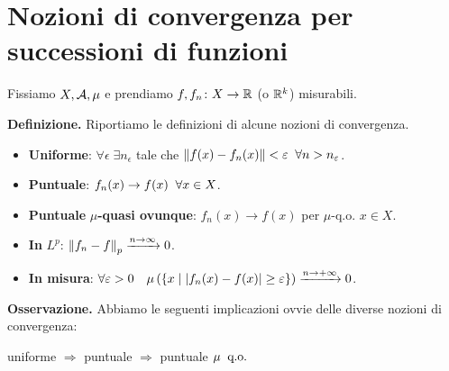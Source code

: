 %
%

\section{Nozioni di convergenza per successioni di funzioni}
Fissiamo $X,\mathcal{A},\mu$ e prendiamo $f, f_n \colon X \to \mathbb R$ (o $\mathbb R^k$) misurabili.

\textbf{Definizione.}
Riportiamo le definizioni di alcune nozioni di convergenza.

\begin{itemize}

\item \textbf{Uniforme}: $\forall \epsilon \; \exists n_{\epsilon}$ tale che $\left\lVert f(x) - f_n(x) \right\rVert < \varepsilon \;\; \forall n > n_\varepsilon$.

\item \textbf{Puntuale}: $f_n(x) \to f(x) \;\; \forall x \in X$.

\item \textbf{Puntuale} $\mu$\textbf{-quasi ovunque}: $f_n(x) \to f(x)$ per $\mu$-q.o. $x \in X$.

\item \textbf{In} $L^p$: $\left\lVert f_n - f \right\rVert_p \xrightarrow{n \to \infty} 0$.

\item \textbf{In misura}: $\displaystyle \forall \varepsilon > 0 \quad \mu \left( \left\{ x \;\middle|\; \left| f_n(x) - f(x) \right| \geq \varepsilon \right\} \right) \xrightarrow{n \to +\infty} 0$.

\end{itemize}

\textbf{Osservazione.}
Abbiamo le seguenti implicazioni ovvie delle diverse nozioni di convergenza:

\begin{center}
	uniforme $\Rightarrow$ puntuale $\Rightarrow$ puntuale $\mu \;\;\text{q.o.}$
\end{center}


